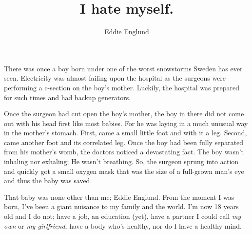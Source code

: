 \documentclass[12pt]{article}
\author{Eddie Englund}
\title{I hate myself.}
\begin{document}
    \maketitle

    There was once a boy born under one of the worst snowstorms Sweden has ever seen. Electricity was almost failing upon the hospital as the surgeons were performing a c-section on the boy's mother. Luckily, the hospital was prepared for such times and had backup generators.
    
    
    Once the surgeon had cut open the boy's mother, the boy in there did not come out with his head first like most babies. For he was laying in a much unusual way in the mother's stomach. First, came a small little foot and with it a leg. Second, came another foot and its correlated leg. Once the boy had been fully separated from his mother's womb, the doctors noticed a devastating fact. The boy wasn't inhaling nor exhaling; He wasn't breathing. So, the surgeon sprung into action and quickly got a small oxygen mask that was the size of a full-grown man's eye and thus the baby was saved.


    That baby was none other than me; Eddie Englund. From the moment I was born, I've been a giant nuisance to my family and the world. I'm now 18 years old and I do not; have a job, an education (yet), have a partner I could call \textit{my own} or \textit{my girlfriend}, have a body who's healthy, nor do I have a healthy mind.
\end{document}
